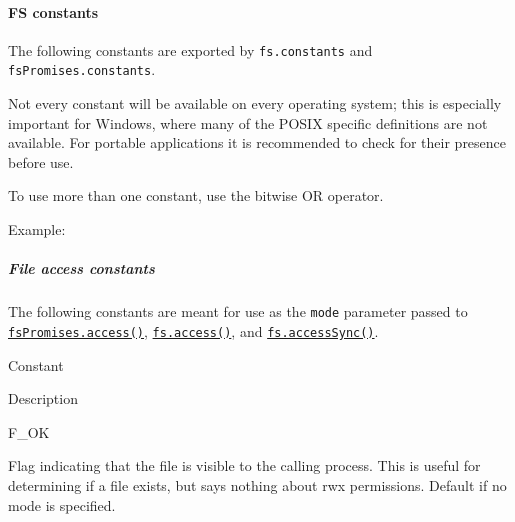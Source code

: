 \paragraph{FS constants}\label{fs-constants}

The following constants are exported by \texttt{fs.constants} and
\texttt{fsPromises.constants}.

Not every constant will be available on every operating system; this is
especially important for Windows, where many of the POSIX specific
definitions are not available. For portable applications it is
recommended to check for their presence before use.

To use more than one constant, use the bitwise OR \texttt{\textbar{}}
operator.

Example:

\begin{Shaded}
\begin{Highlighting}[]
\OperatorTok{,} \OperatorTok{;}

\NormalTok{ \{}
\OperatorTok{,}
\OperatorTok{,}
\OperatorTok{,}
\NormalTok{\} }\OperatorTok{=}\OperatorTok{;}

\NormalTok{(}\OperatorTok{,}\OperatorTok{|}\OperatorTok{|}\OperatorTok{,}\OperatorTok{,}\KeywordTok{=\textgreater{}}\NormalTok{ \{}
\NormalTok{\})}\OperatorTok{;}
\end{Highlighting}
\end{Shaded}

\subparagraph{File access constants}\label{file-access-constants}

The following constants are meant for use as the \texttt{mode} parameter
passed to
\hyperref[fspromisesaccesspath-mode]{\texttt{fsPromises.access()}},
\hyperref[fsaccesspath-mode-callback]{\texttt{fs.access()}}, and
\hyperref[fsaccesssyncpath-mode]{\texttt{fs.accessSync()}}.

Constant

Description

F\_OK

Flag indicating that the file is visible to the calling process. This is
useful for determining if a file exists, but says nothing about rwx
permissions. Default if no mode is specified.

